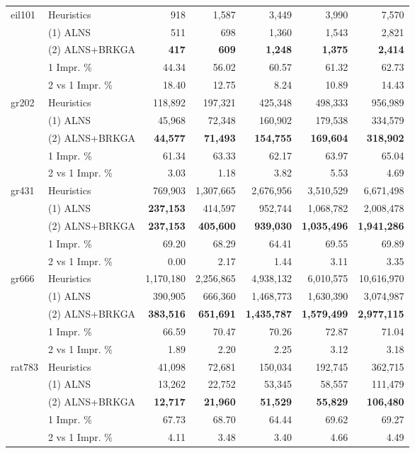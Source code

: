 \documentclass{article}
\begin{document}
\begin{longtable}{p{1.5cm}|p{3cm}|r|r|r|r|r}
eil101 & Heuristics & 918 & 1,587 & 3,449 & 3,990 & 7,570 \\
  & (1) ALNS & 511 & 698 & 1,360 & 1,543 & 2,821 \\
  & (2) ALNS+BRKGA & \textbf{417} & \textbf{609} & \textbf{1,248} & \textbf{1,375} & \textbf{2,414} \\
 & 1 Impr. \% &44.34 & 56.02 & 60.57 & 61.32 & 62.73 \\
& 2 vs 1 Impr. \% & 18.40 & 12.75 & 8.24 & 10.89 & 14.43 \\
\midrule

gr202 & Heuristics & 118,892 & 197,321 & 425,348 & 498,333 & 956,989 \\
  & (1) ALNS & 45,968 & 72,348 & 160,902 & 179,538 & 334,579 \\
  & (2) ALNS+BRKGA & \textbf{44,577} & \textbf{71,493} & \textbf{154,755} & \textbf{169,604} & \textbf{318,902} \\
 & 1 Impr. \% &61.34 & 63.33 & 62.17 & 63.97 & 65.04 \\
& 2 vs 1 Impr. \% & 3.03 & 1.18 & 3.82 & 5.53 & 4.69 \\
\midrule

gr431 & Heuristics & 769,903 & 1,307,665 & 2,676,956 & 3,510,529 & 6,671,498 \\
  & (1) ALNS & \textbf{237,153} & 414,597 & 952,744 & 1,068,782 & 2,008,478 \\
  & (2) ALNS+BRKGA & \textbf{237,153} & \textbf{405,600} & \textbf{939,030} & \textbf{1,035,496} & \textbf{1,941,286} \\
 & 1 Impr. \% &69.20 & 68.29 & 64.41 & 69.55 & 69.89 \\
& 2 vs 1 Impr. \% & 0.00 & 2.17 & 1.44 & 3.11 & 3.35 \\
\midrule

gr666 & Heuristics & 1,170,180 & 2,256,865 & 4,938,132 & 6,010,575 & 10,616,970 \\
  & (1) ALNS & 390,905 & 666,360 & 1,468,773 & 1,630,390 & 3,074,987 \\
  & (2) ALNS+BRKGA & \textbf{383,516} & \textbf{651,691} & \textbf{1,435,787} & \textbf{1,579,499} & \textbf{2,977,115} \\
 & 1 Impr. \% &66.59 & 70.47 & 70.26 & 72.87 & 71.04 \\
& 2 vs 1 Impr. \% & 1.89 & 2.20 & 2.25 & 3.12 & 3.18 \\
\midrule

rat783 & Heuristics & 41,098 & 72,681 & 150,034 & 192,745 & 362,715 \\
  & (1) ALNS & 13,262 & 22,752 & 53,345 & 58,557 & 111,479 \\
  & (2) ALNS+BRKGA & \textbf{12,717} & \textbf{21,960} & \textbf{51,529} & \textbf{55,829} & \textbf{106,480} \\
 & 1 Impr. \% &67.73 & 68.70 & 64.44 & 69.62 & 69.27 \\
& 2 vs 1 Impr. \% & 4.11 & 3.48 & 3.40 & 4.66 & 4.49 \\
\midrule


\end{longtable}
\end{document}
